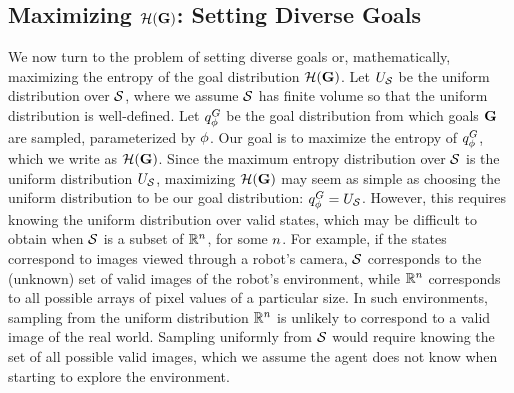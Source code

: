 \subsection{Maximizing ${\mathcal{H}}(\mathbf{G})$: Setting Diverse Goals}\label{sec:prelim-max-ent}
We now turn to the problem of setting diverse goals or, mathematically, maximizing the entropy of the goal distribution ${\mathcal{H}}(\mathbf{G})$.
Let ${U_{\mathcal{S}}}$ be the uniform distribution over ${\mathcal{S}}$, where we assume ${\mathcal{S}}$ has finite volume so that the uniform distribution is well-defined.
Let ${q^G_{{\phi}}}$ be the goal distribution from which goals $\mathbf{G}$ are sampled, parameterized by ${\phi}$.
Our goal is to maximize the entropy of ${q^G_{{\phi}}}$, which we write as ${\mathcal{H}}(\mathbf{G})$.
Since the maximum entropy distribution over ${\mathcal{S}}$ is the uniform distribution ${U_{\mathcal{S}}}$, maximizing ${\mathcal{H}}(\mathbf{G})$ may seem as simple as choosing the uniform distribution to be our goal distribution: ${q^G_{{\phi}}} = {U_{\mathcal{S}}}$.
However, this requires knowing the uniform distribution over valid states, which may be difficult to obtain when ${\mathcal{S}}$ is a subset of ${\mathbb{R}^n}$, for some $n$.
For example, if the states correspond to images viewed through a robot's camera, ${\mathcal{S}}$ corresponds to the (unknown) set of valid images of the robot's environment, while ${\mathbb{R}^n}$ corresponds to all possible arrays of pixel values of a particular size.
In such environments, sampling from the uniform distribution ${\mathbb{R}^n}$ is unlikely to correspond to a valid image of the real world.
Sampling uniformly from ${\mathcal{S}}$ would require knowing the set of all possible valid images, which we assume the agent does not know when starting to explore the environment.

